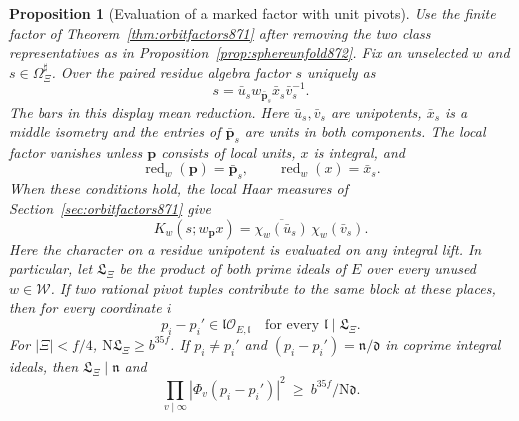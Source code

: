 \documentclass[a4paper,11pt]{article}
\newtheorem{proposition}{Proposition}[section]
\theoremstyle{definition}
\theoremstyle{remark}
\numberwithin{equation}{section}
\begin{document}
\begin{proposition}[Evaluation of a marked factor with unit pivots]
\leavevmode\label{prop:localpivot873}
Use the finite factor of Theorem~\ref{thm:orbitfactors871} after
removing the two class representatives as in
Proposition~\ref{prop:sphereunfold872}. Fix an unselected \(w\)
and \(s\in\Omega_\Xi^\sharp\). Over the paired residue algebra
factor \(s\) uniquely as
\[
      s=\bar u_s w_{\bar{\mathbf p}_s}\bar x_s \bar v_s^{-1}.
\]
The bars in this display mean reduction. Here
\(\bar u_s,\bar v_s\) are unipotents, \(\bar x_s\) is a middle
isometry and the entries of \(\bar{\mathbf p}_s\) are units
in both components. The local factor vanishes unless
\(\mathbf p\) consists of local units, \(x\) is integral, and
\[
   \operatorname{red}_w(\mathbf p)=\bar{\mathbf p}_s,\qquad
   \operatorname{red}_w(x)=\bar x_s .
\]
When these conditions hold, the local Haar measures of
Section~\ref{sec:orbitfactors871} give
\[
     K_w(s;w_{\mathbf p}x)=
             \overline{\chi_w(\bar u_s)}\,\chi_w(\bar v_s).
\]
Here the character on a residue unipotent is evaluated on any
integral lift. In particular, let \(\mathfrak L_\Xi\) be the
product of both prime ideals of \(E\) over every unused
\(w\in\mathcal W\). If two rational pivot tuples contribute to
the same block at these places, then for every coordinate \(i\)
\[
  p_i-p_i'\in\mathfrak l\mathcal O_{E,\mathfrak l}
            \quad\text{for every }\mathfrak l\mid\mathfrak L_\Xi .
\]
For \(|\Xi|<f/4\), \(\mathrm N\mathfrak L_\Xi\ge b^{35f}\).
If \(p_i\ne p_i'\) and
\((p_i-p_i')=\mathfrak n/\mathfrak d\) in coprime integral
ideals, then \(\mathfrak L_\Xi\mid\mathfrak n\) and
\[
        \prod_{v\mid\infty}|\Phi_v(p_i-p_i')|^2
              \ \ge\ b^{35f}/\mathrm N\mathfrak d.
\]
\end{proposition}
\end{document}
